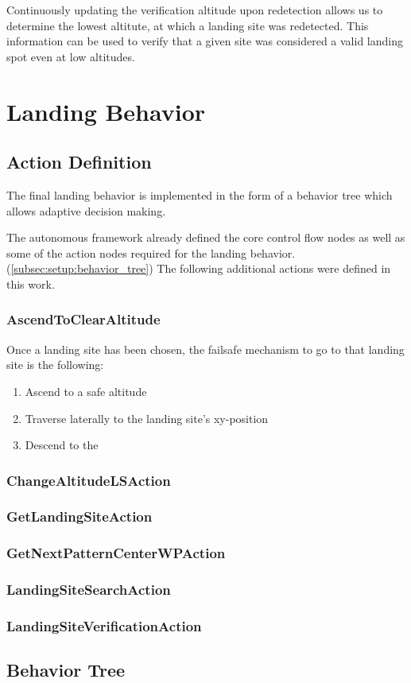 Continuously updating the verification altitude upon redetection allows us to determine the lowest altitute, at which a landing site was redetected. This information can be used to verify that a given site was considered a valid landing spot even at low altitudes. 

\section{Landing Behavior}


\subsection{Action Definition}
The final landing behavior is implemented in the form of a behavior tree which allows adaptive decision making.

The autonomous framework already defined the core control flow nodes as well as some of the action nodes required for the landing behavior. (\ref{subsec:setup:behavior_tree}) The following additional actions were defined in this work. 

\subsubsection{AscendToClearAltitude}
Once a landing site has been chosen, the failsafe mechanism to go to that landing site is the following:

\begin{enumerate}
    \item Ascend to a safe altitude
    \item Traverse laterally to the landing site's xy-position
    \item Descend to the 
\end{enumerate}
\subsubsection{ChangeAltitudeLSAction}
\subsubsection{GetLandingSiteAction}
\subsubsection{GetNextPatternCenterWPAction}
\subsubsection{LandingSiteSearchAction}
\subsubsection{LandingSiteVerificationAction}

\subsection{Behavior Tree}


